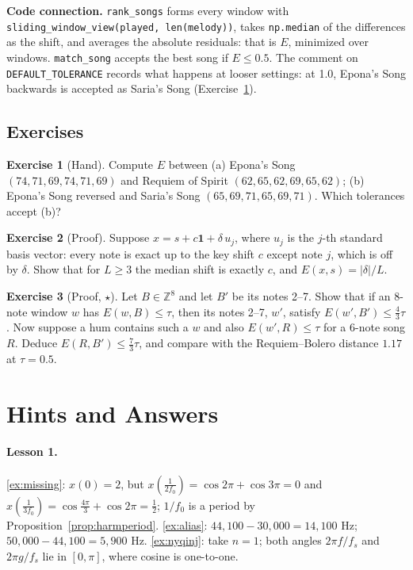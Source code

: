 \documentclass[11pt]{article}
\theoremstyle{definition}
\newtheorem{innerexercise}{Exercise}[section]
\newenvironment{exercise}[1][]{\begin{innerexercise}[#1]}{\end{innerexercise}}
\newcommand{\Z}{\mathbb{Z}}
\newcommand{\abs}[1]{\lvert #1\rvert}
\newcommand{\one}{\mathbf{1}}
\newcommand{\code}[1]{\texttt{#1}}
\begin{document}
\begin{connection}
\textbf{Code connection.} \code{rank\_songs} forms every window with
\code{sliding\_window\_view(played, len(melody))}, takes \code{np.median} of the
differences as the shift, and averages the absolute residuals: that is $E$, minimized
over windows. \code{match\_song} accepts the best song if $E\le0.5$. The comment on
\code{DEFAULT\_TOLERANCE} records what happens at looser settings: at 1.0, Epona's Song
backwards is accepted as Saria's Song (Exercise~\ref{ex:epona}).
\end{connection}

\subsection{Exercises}
\begin{exercise}[Hand]\label{ex:epona}
Compute $E$ between (a) Epona's Song $(74,71,69,74,71,69)$ and Requiem of Spirit
$(62,65,62,69,65,62)$; (b) Epona's Song reversed and Saria's Song
$(65,69,71,65,69,71)$. Which tolerances accept (b)?
\end{exercise}

\begin{exercise}[Proof]\label{ex:onewrong}
Suppose $x=s+c\one+\delta\,u_j$, where $u_j$ is the $j$-th standard basis vector: every
note is exact up to the key shift $c$ except note $j$, which is off by $\delta$. Show
that for $L\ge3$ the median shift is exactly $c$, and $E(x,s)=\abs\delta/L$.
\end{exercise}

\begin{exercise}[Proof, $\star$]\label{ex:mixed}
Let $B\in\Z^8$ and let $B'$ be its notes 2--7. Show that if an 8-note window $w$ has
$E(w,B)\le\tau$, then its notes 2--7, $w'$, satisfy $E(w',B')\le\frac43\tau$. Now
suppose a hum contains such a $w$ and also $E(w',R)\le\tau$ for a 6-note song $R$.
Deduce $E(R,B')\le\frac73\tau$, and compare with the Requiem--Bolero distance $1.17$ at
$\tau=0.5$.
\end{exercise}

\appendix
\section{Hints and Answers}\label{app:hints}

\paragraph{Lesson 1.} \ref{ex:missing}: $x(0)=2$, but
$x(\frac1{2f_0})=\cos2\pi+\cos3\pi=0$ and $x(\frac1{3f_0})=\cos\frac{4\pi}3+\cos2\pi=\frac12$;
$1/f_0$ is a period by Proposition~\ref{prop:harmperiod}.
\ref{ex:alias}: $44{,}100-30{,}000=14{,}100$ Hz; $50{,}000-44{,}100=5{,}900$ Hz.
\ref{ex:nyqinj}: take $n=1$; both angles $2\pi f/f_s$ and $2\pi g/f_s$ lie in
$[0,\pi]$, where cosine is one-to-one.
\end{document}
